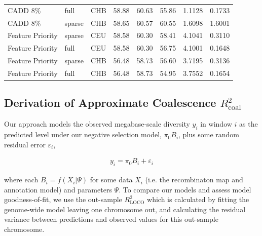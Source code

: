\documentclass[11pt]{article}
\begin{document}
\begin{table}
\begin{tabular}{lll|crr|cc}
          CADD 8\% &              full &          CHB &                        58.88 &             60.63 &            55.86 &                                 1.1128 &                                0.1733 \\
          CADD 8\% &            sparse &          CHB &                        58.65 &             60.57 &            60.55 &                                 1.6098 &                                1.6001 \\
  Feature Priority &            sparse &          CEU &                        58.58 &             60.30 &            58.41 &                                 4.1041 &                                0.3110 \\
  Feature Priority &              full &          CEU &                        58.58 &             60.30 &            56.75 &                                 4.1001 &                                0.1648 \\
  Feature Priority &            sparse &          CHB &                        56.48 &             58.73 &            56.60 &                                 3.7195 &                                0.3136 \\
  Feature Priority &              full &          CHB &                        56.48 &             58.73 &            54.95 &                                 3.7552 &                                0.1654 \\
\hline
\end{tabular}
\end{table}


\subsection{Derivation of Approximate Coalescence $R_\text{coal}^2$}
\label{supp:r2-coal}

Our approach models the observed megabase-scale diversity $y_i$ in window $i$
as the predicted level under our negative selection model, $\pi_0 B_i$, plus
some random residual error $\varepsilon_i$,

\begin{align}
    y_i = \pi_0 B_i + \varepsilon_i
\end{align}

where each $B_i = f(X_i | \Psi)$ for some data $X_i$ (i.e. the recombinaton map
and annotation model) and parameters $\Psi$. To compare our models and assess
model goodness-of-fit, we use the out-sample $R_\text{LOCO}^2$ which is
calculated by fitting the genome-wide model leaving one chromosome out, and
calculating the residual variance between predictions and observed values for
this out-sample chromosome. 
\end{document}
